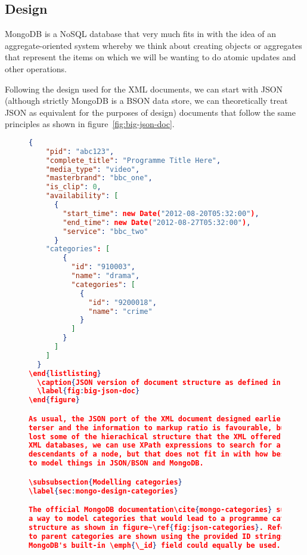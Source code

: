 \documentclass[11pt,a4paper]{article}
\begin{document}
\subsection{Design}

MongoDB is a NoSQL database that very much fits in with the idea of
an aggregate-oriented system whereby we think about creating objects
or aggregates that represent the items on which we will be wanting
to do atomic updates and other operations.

Following the design used for the XML documents, we can start with
JSON (although strictly MongoDB is a BSON data store, we can theoretically
treat JSON as equivalent for the purposes of design)
documents that follow the same principles as shown in figure~\ref{fig:big-json-doc}.

\begin{figure}[p]
\begin{lstlisting}[language=json]
  {
    "pid": "abc123",
    "complete_title": "Programme Title Here",
    "media_type": "video",
    "masterbrand": "bbc_one",
    "is_clip": 0,
    "availability": [
      {
        "start_time": new Date("2012-08-20T05:32:00"),
        "end_time": new Date("2012-08-27T05:32:00"),
        "service": "bbc_two"
      }
    "categories": [
        {
          "id": "910003",
          "name": "drama",
          "categories": [
            {
              "id": "9200018",
              "name": "crime"
            }
          ]
        }
      ]
    ]
  }
\end{listlisting}
  \caption{JSON version of document structure as defined in XML earlier}
  \label{fig:big-json-doc}
\end{figure}

As usual, the JSON port of the XML document designed earlier is somewhat
terser and the information to markup ratio is favourable, but have we
lost some of the hierachical structure that the XML offered? With
XML databases, we can use XPath expressions to search for arbitrary
descendants of a node, but that does not fit in with how best
to model things in JSON/BSON and MongoDB.

\subsubsection{Modelling categories}
\label{sec:mongo-design-categories}

The official MongoDB documentation\cite{mongo-categories} suggests
a way to model categories that would lead to a programme category
structure as shown in figure~\ref{fig:json-categories}. References
to parent categories are shown using the provided ID strings, but
MongoDB's built-in \emph{\_id} field could equally be used.


\end{lstlisting}
\end{figure}
\end{document}
